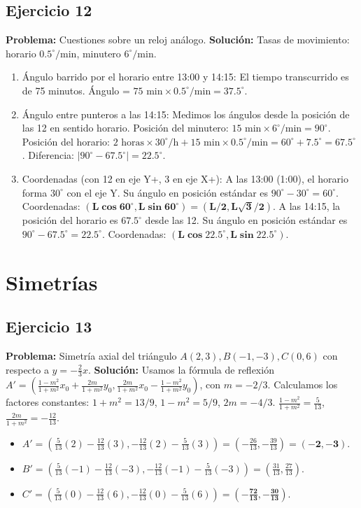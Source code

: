 \documentclass[12pt, letterpaper]{article}
\begin{document}
\subsection{Ejercicio 12}
\textbf{Problema:} Cuestiones sobre un reloj análogo.
\textbf{Solución:} Tasas de movimiento: horario $0.5^\circ/\text{min}$, minutero $6^\circ/\text{min}$.
\begin{enumerate}[label=\alph*)]
    \item Ángulo barrido por el horario entre 13:00 y 14:15: El tiempo transcurrido es de 75 minutos.
    Ángulo = $75 \text{ min} \times 0.5^\circ/\text{min} = \mathbf{37.5^\circ}$.
    
    \item Ángulo entre punteros a las 14:15: Medimos los ángulos desde la posición de las 12 en sentido horario.
    Posición del minutero: $15 \text{ min} \times 6^\circ/\text{min} = 90^\circ$.
    Posición del horario: $2 \text{ horas} \times 30^\circ/\text{h} + 15 \text{ min} \times 0.5^\circ/\text{min} = 60^\circ + 7.5^\circ = 67.5^\circ$.
    Diferencia: $|90^\circ - 67.5^\circ| = \mathbf{22.5^\circ}$.
    
    \item Coordenadas (con 12 en eje Y+, 3 en eje X+):
    A las 13:00 (1:00), el horario forma $30^\circ$ con el eje Y. Su ángulo en posición estándar es $90^\circ - 30^\circ = 60^\circ$. Coordenadas: $\mathbf{(L\cos60^\circ, L\sin60^\circ) = (L/2, L\sqrt{3}/2)}$.
    A las 14:15, la posición del horario es $67.5^\circ$ desde las 12. Su ángulo en posición estándar es $90^\circ - 67.5^\circ = 22.5^\circ$. Coordenadas: $\mathbf{(L\cos22.5^\circ, L\sin22.5^\circ)}$.
\end{enumerate}

\newpage
\section{Simetrías}

\subsection{Ejercicio 13}
\textbf{Problema:} Simetría axial del triángulo $A(2,3), B(-1,-3), C(0,6)$ con respecto a $y = -\frac{2}{3}x$.
\textbf{Solución:} Usamos la fórmula de reflexión $A' = (\frac{1-m^2}{1+m^2}x_0 + \frac{2m}{1+m^2}y_0, \frac{2m}{1+m^2}x_0 - \frac{1-m^2}{1+m^2}y_0)$, con $m=-2/3$.
Calculamos los factores constantes: $1+m^2=13/9$, $1-m^2=5/9$, $2m=-4/3$.
$\frac{1-m^2}{1+m^2} = \frac{5}{13}$, $\frac{2m}{1+m^2} = -\frac{12}{13}$.
\begin{itemize}
    \item $A' = (\frac{5}{13}(2) - \frac{12}{13}(3), -\frac{12}{13}(2) - \frac{5}{13}(3)) = (-\frac{26}{13}, -\frac{39}{13}) = \mathbf{(-2, -3)}$.
    \item $B' = (\frac{5}{13}(-1) - \frac{12}{13}(-3), -\frac{12}{13}(-1) - \frac{5}{13}(-3)) = (\frac{31}{13}, \frac{27}{13})$.
    \item $C' = (\frac{5}{13}(0) - \frac{12}{13}(6), -\frac{12}{13}(0) - \frac{5}{13}(6)) = \mathbf{(-\frac{72}{13}, -\frac{30}{13})}$.
\end{itemize}
\end{document}
